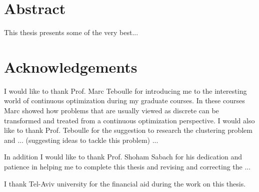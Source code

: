 \setcounter{page}{3}
\chapter*{Abstract}

This thesis presents some of the very best...




\chapter*{Acknowledgements}

I would like to thank Prof. Marc Teboulle for introducing me to the interesting world of continuous optimization during my graduate courses.    In these courses Marc showed how problems that are usually viewed as discrete can be transformed and treated from a continuous optimization perspective. I would also like to thank Prof. Teboulle for the suggestion to research the clustering problem and ... (suggesting ideas to tackle this problem) ...

In addition I would like to thank Prof. Shoham Sabach for his dedication and patience in helping me to complete this thesis and revising and correcting the ...

I thank Tel-Aviv university for the financial aid during the work on this thesis.


\nobreak
